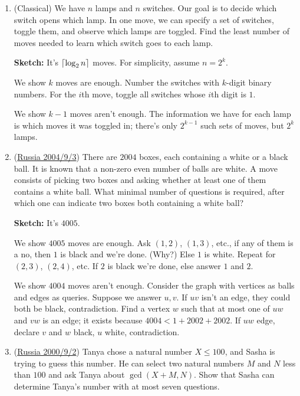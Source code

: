 \documentclass[11pt,paper=letter]{scrartcl}
\begin{document}
\begin{enumerate}

\item (Classical) We have $n$ lamps and $n$ switches. Our goal is to decide which switch opens which lamp. In one move, we can specify a set of switches, toggle them, and observe which lamps are toggled. Find the least number of moves needed to learn which switch goes to each lamp.

\textbf{Sketch:} It's $\left\lceil \log_2 n \right\rceil$ moves. For simplicity, assume $n = 2^k$.

We show $k$ moves are enough. Number the switches with $k$-digit binary numbers. For the $i$th move, toggle all switches whose $i$th digit is $1$.

We show $k - 1$ moves aren't enough. The information we have for each lamp is which moves it was toggled in; there's only $2^{k-1}$ such sets of moves, but $2^k$ lamps.

\item (\href{https://artofproblemsolving.com/community/c6h5504p17843}{Russia 2004/9/3}) There are $2004$ boxes, each containing a white or a black ball. It is known that a non-zero even number of balls are white. A move consists of picking two boxes and asking whether at least one of them contains a white ball. What minimal number of questions is required, after which one can indicate two boxes both containing a white ball?

\textbf{Sketch:} It's $4005$.

We show $4005$ moves are enough. Ask $(1, 2)$, $(1, 3)$, etc., if any of them is a no, then $1$ is black and we're done. (Why?) Else $1$ is white. Repeat for $(2, 3)$, $(2, 4)$, etc. If $2$ is black we're done, else answer $1$ and $2$.

We show $4004$ moves aren't enough. Consider the graph with vertices as balls and edges as queries. Suppose we answer $u, v$. If $uv$ isn't an edge, they could both be black, contradiction. Find a vertex $w$ such that at most one of $uw$ and $vw$ is an edge; it exists because $4004 < 1 + 2002 + 2002$. If $uw$ edge, declare $v$ and $w$ black, $u$ white, contradiction.

\item (\href{https://artofproblemsolving.com/community/c6h514285p2889223}{Russia 2000/9/2}) Tanya chose a natural number $X\le100$, and Sasha is trying to guess this number. He can select two natural numbers $M$ and $N$ less than $100$ and ask Tanya about $\gcd(X+M,N)$. Show that Sasha can determine Tanya's number with at most seven questions.


\end{enumerate}
\end{document}
